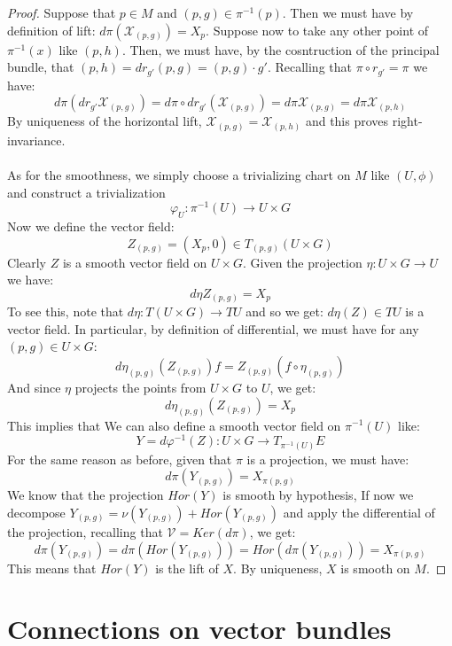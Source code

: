 \documentclass[12pt,a4paper]{report}
\theoremstyle{definition}
\theoremstyle{Theorem}
\theoremstyle{definition}
\theoremstyle{definition}
\begin{document}
		\begin{proof}
			Suppose that $p\in M$ and $(p,g)\in\pi^{-1}(p)$. Then we must have by definition of lift: $d\pi(\mathcal{X}_{(p,g)})=X_p$. Suppose now to take any other point of $\pi^{-1}(x)$ like $(p,h)$. Then, we must have, by the cosntruction of the principal bundle, that $(p,h)=dr_{g'}(p,g)=(p,g)\cdot g'$. Recalling that $\pi\circ r_{g'}=\pi$ we have:
			$$d\pi(dr_{g'}\mathcal{X}_{(p,g)})=d\pi\circ dr_{g'}(\mathcal{X}_{(p,g)})=d\pi\mathcal{X}_{(p,g)}=d\pi\mathcal{X}_{(p,h)}$$
			By uniqueness of the horizontal lift, $\mathcal{X}_{(p,g)}=\mathcal{X}_{(p,h)}$ and this proves right-invariance.\\
			\\
			As for the smoothness, we simply choose a trivializing chart on $M$ like $(U,\phi)$ and construct a trivialization 
			$$\varphi_U:\pi^{-1}(U)\rightarrow U\times G$$
			Now we define the vector field:
			$$Z_{(p,g)}=(X_p,0)\in T_{(p,g)}(U\times G)$$
			Clearly $Z$ is a smooth vector field on $U\times G$. Given the projection $\eta:U\times G\rightarrow U$ we have:
			$$d\eta Z_{(p,g)}=X_p$$
			To see this, note that $d\eta:T(U\times G)\rightarrow TU$ and so we get: $d\eta(Z)\in TU$ is a vector field. In particular, by definition of differential, we must have for any $(p,g)\in U\times G$:
			$$d\eta_{(p,g)}(Z_{(p,g)})f=Z_{(p,g)}(f\circ \eta_{(p,g)})$$
			And since $\eta$ projects the points from $U\times G$ to $U$, we get:
			$$d\eta_{(p,g)}(Z_{(p,g)})=X_p$$
			This implies that
			We can also define a smooth vector field on $\pi^{-1}(U)$ like:
			$$Y=d\varphi^{-1}(Z):U\times G \rightarrow T_{\pi^{-1}(U)}E$$
			For the same reason as before, given that $\pi$ is a projection, we must have:
			$$d\pi(Y_{(p,g)})=X_{\pi(p,g)}$$
			We know that the projection $Hor(Y)$ is smooth by hypothesis, If now we decompose $Y_{(p,g)}=\nu(Y_{(p,g)})+Hor(Y_{(p,g)})$ and apply the differential of the projection, recalling that $\mathcal{V}=Ker(d\pi)$, we get:
			$$d\pi(Y_{(p,g)})=d\pi(Hor(Y_{(p,g)}))=Hor(d\pi(Y_{(p,g)}))=X_{\pi(p,g)}$$
			This means that $Hor(Y)$ is the lift of $X$. By uniqueness, $X$ is smooth on $M$.
		\end{proof}
	\chapter{Connections on vector bundles}
\end{document}

